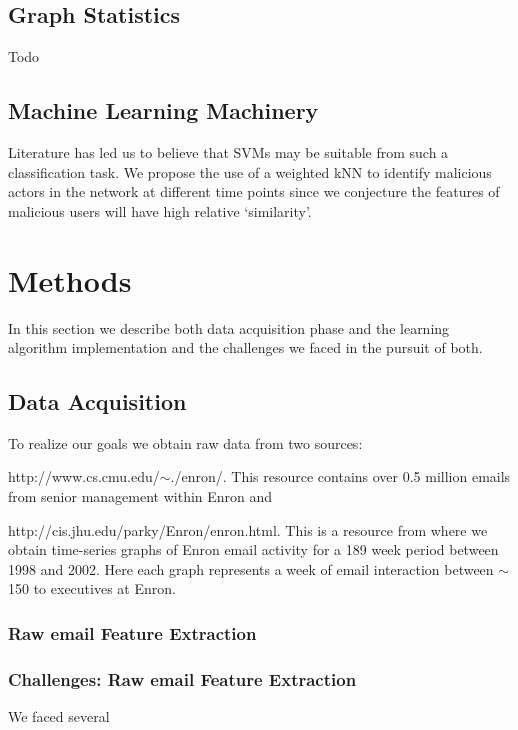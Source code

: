 \documentclass[11pt,letterpaper]{article}
\begin{document}
\subsection{Graph Statistics}
Todo

\subsection{Machine Learning Machinery}
Literature \cite{shon2007hybrid,shon2005machine} has 
led us to believe that SVMs may be suitable from such a classification task. 
We propose the use of a weighted kNN to identify malicious actors in the network 
at different time points since we conjecture the features of malicious users will 
have high relative `similarity'.


\section{Methods}
In this section we describe both data acquisition phase and the learning algorithm
implementation and the challenges we faced in the pursuit of both.

\subsection{Data Acquisition}
To realize our goals we obtain raw data from two sources:
\begin{inparaenum}[\itshape(i)]
\item http://www.cs.cmu.edu/$\sim$./enron/. This resource contains over 0.5 million
emails from senior management within Enron and 
\item http://cis.jhu.edu/parky/Enron/enron.html. This is a resource from where we obtain
time-series graphs of Enron email activity for a 189 week period between 1998 and 2002.
Here each graph represents a week of email interaction between $\sim$150 to executives
at Enron.
\end{inparaenum}

\subsubsection{Raw email Feature Extraction}

\subsubsection{Challenges: Raw email Feature Extraction}
We faced several
\end{document}
